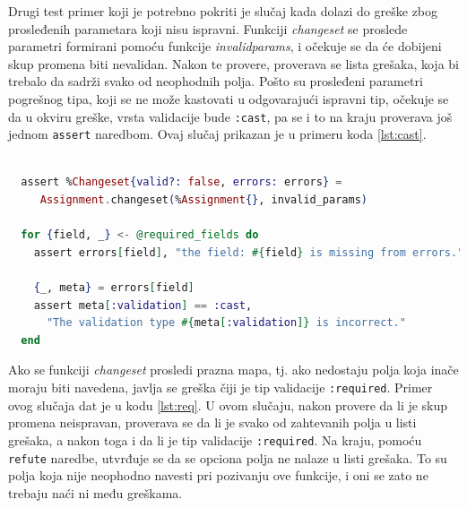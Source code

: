 \documentclass[12pt,oneside]{memoir}
\begin{document}
\par Drugi test primer koji je potrebno pokriti je slučaj kada dolazi do greške zbog prosleđenih parametara koji nisu ispravni. Funkciji \emph{changeset} se proslede parametri formirani pomoću funkcije \emph{invalid{\textunderscore}params}, i očekuje se da će dobijeni skup promena biti nevalidan. Nakon te provere, proverava se lista grešaka, koja bi trebalo da sadrži svako od neophodnih polja. Pošto su prosleđeni parametri pogrešnog tipa, koji se ne može kastovati u odgovarajući ispravni tip, očekuje se da u okviru greške, vrsta validacije bude \texttt{:cast}, pa se i to na kraju proverava još jednom \texttt{assert} naredbom. Ovaj slučaj prikazan je u primeru koda \ref{lst:cast}.  \\

\begin{minipage}{\linewidth}
\begin{lstlisting}[language=elixir, basicstyle=\small, caption={Test primer neuspešne upotrebe funkcije \emph{changeset/2}, prosleđivanjem neodgovarajućih parametara},captionpos=b, label={lst:cast}]
  
  assert %Changeset{valid?: false, errors: errors} = 
     Assignment.changeset(%Assignment{}, invalid_params)

  for {field, _} <- @required_fields do
    assert errors[field], "the field: #{field} is missing from errors."

    {_, meta} = errors[field]
    assert meta[:validation] == :cast,
      "The validation type #{meta[:validation]} is incorrect."
  end
\end{lstlisting}
\end{minipage}

\par Ako se funkciji \emph{changeset} prosledi prazna mapa, tj. ako nedostaju polja koja inače moraju biti navedena, javlja se greška čiji je tip validacije \texttt{:required}. Primer ovog slučaja dat je u kodu \ref{lst:req}. U ovom slučaju, nakon provere da li je skup promena neispravan, proverava se da li je svako od zahtevanih polja u listi grešaka, a nakon toga i da li je tip validacije \texttt{:required}. Na kraju, pomoću \texttt{refute} naredbe, utvrđuje se da se opciona polja ne nalaze u listi grešaka. To su polja koja nije neophodno navesti pri pozivanju ove funkcije, i oni se zato ne trebaju naći ni među greškama.\\
\end{document}
